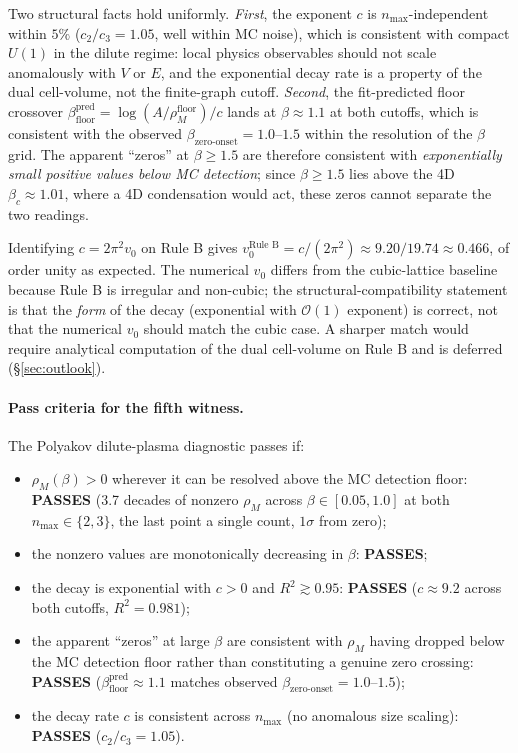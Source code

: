 \documentclass[11pt]{article}
\begin{document}
Two structural facts hold uniformly. \emph{First}, the exponent $c$ is
$n_\text{max}$-independent within $5\%$ ($c_2/c_3=1.05$, well within MC noise),
which is consistent with compact $U(1)$ in the dilute regime: local
physics observables should not scale anomalously with $V$ or $E$, and the
exponential decay rate is a property of the dual cell-volume, not the
finite-graph cutoff. \emph{Second}, the fit-predicted floor crossover
$\beta_\text{floor}^\text{pred}=\log(A/\rho_M^\text{floor})/c$ lands at
$\beta\approx 1.1$ at both cutoffs, which is consistent with the observed
$\beta_\text{zero-onset}=1.0$--$1.5$ within the resolution of the $\beta$
grid. The apparent ``zeros'' at $\beta\ge 1.5$ are therefore
consistent with \emph{exponentially small positive values below MC
detection}; since $\beta\ge 1.5$ lies above the 4D $\beta_c\approx 1.01$,
where a 4D condensation would act, these zeros cannot separate the two
readings.

Identifying $c=2\pi^2 v_0$ on Rule B gives
$v_0^\text{Rule B}=c/(2\pi^2)\approx 9.20/19.74\approx 0.466$, of order unity
as expected. The numerical $v_0$ differs from the cubic-lattice baseline
because Rule B is irregular and non-cubic; the structural-compatibility
statement is that the \emph{form} of the decay (exponential with $\mathcal{O}(1)$
exponent) is correct, not that the numerical $v_0$ should match the cubic
case. A sharper match would require analytical computation of the dual
cell-volume on Rule B and is deferred (\S\ref{sec:outlook}).

\paragraph{Pass criteria for the fifth witness.} The Polyakov dilute-plasma
diagnostic passes if:
\begin{itemize}
\item[(a)] $\rho_M(\beta)>0$ wherever it can be resolved above the MC
detection floor: \textbf{PASSES} (3.7 decades of nonzero $\rho_M$ across
$\beta\in[0.05,1.0]$ at both $n_\text{max}\in\{2,3\}$, the last point a
single count, $1\sigma$ from zero);
\item[(b)] the nonzero values are monotonically decreasing in $\beta$:
\textbf{PASSES};
\item[(c)] the decay is exponential with $c>0$ and $R^2\gtrsim 0.95$:
\textbf{PASSES} ($c\approx 9.2$ across both cutoffs, $R^2=0.981$);
\item[(d)] the apparent ``zeros'' at large $\beta$ are consistent with $\rho_M$
having dropped below the MC detection floor rather than constituting a
genuine zero crossing: \textbf{PASSES} ($\beta_\text{floor}^\text{pred}\approx 1.1$
matches observed $\beta_\text{zero-onset}=1.0$--$1.5$);
\item[(e)] the decay rate $c$ is consistent across $n_\text{max}$ (no
anomalous size scaling): \textbf{PASSES} ($c_2/c_3=1.05$).
\end{itemize}
\end{document}
